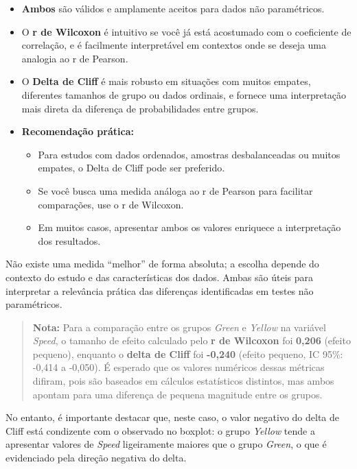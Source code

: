 \documentclass[
]{book}
\providecommand{\tightlist}{%
  \setlength{\itemsep}{0pt}\setlength{\parskip}{0pt}}
\begin{document}
\begin{itemize}
\tightlist
\item
  \textbf{Ambos} são válidos e amplamente aceitos para dados não paramétricos.
\item
  O \textbf{r de Wilcoxon} é intuitivo se você já está acostumado com o coeficiente de correlação, e é facilmente interpretável em contextos onde se deseja uma analogia ao r de Pearson.
\item
  O \textbf{Delta de Cliff} é mais robusto em situações com muitos empates, diferentes tamanhos de grupo ou dados ordinais, e fornece uma interpretação mais direta da diferença de probabilidades entre grupos.
\item
  \textbf{Recomendação prática:}

  \begin{itemize}
  \tightlist
  \item
    Para estudos com dados ordenados, amostras desbalanceadas ou muitos empates, o Delta de Cliff pode ser preferido.
  \item
    Se você busca uma medida análoga ao r de Pearson para facilitar comparações, use o r de Wilcoxon.
  \item
    Em muitos casos, apresentar ambos os valores enriquece a interpretação dos resultados.
  \end{itemize}
\end{itemize}

Não existe uma medida ``melhor'' de forma absoluta; a escolha depende do contexto do estudo e das características dos dados. Ambas são úteis para interpretar a relevância prática das diferenças identificadas em testes não paramétricos.

\begin{quote}
\textbf{Nota:} Para a comparação entre os grupos \emph{Green} e \emph{Yellow} na variável \emph{Speed}, o tamanho de efeito calculado pelo \textbf{r de Wilcoxon} foi \textbf{0,206} (efeito pequeno), enquanto o \textbf{delta de Cliff} foi \textbf{-0,240} (efeito pequeno, IC 95\%: -0,414 a -0,050). É esperado que os valores numéricos dessas métricas difiram, pois são baseados em cálculos estatísticos distintos, mas ambos apontam para uma diferença de pequena magnitude entre os grupos.
\end{quote}

No entanto, é importante destacar que, neste caso, o valor negativo do delta de Cliff está condizente com o observado no boxplot: o grupo \emph{Yellow} tende a apresentar valores de \emph{Speed} ligeiramente maiores que o grupo \emph{Green}, o que é evidenciado pela direção negativa do delta.
\end{document}
